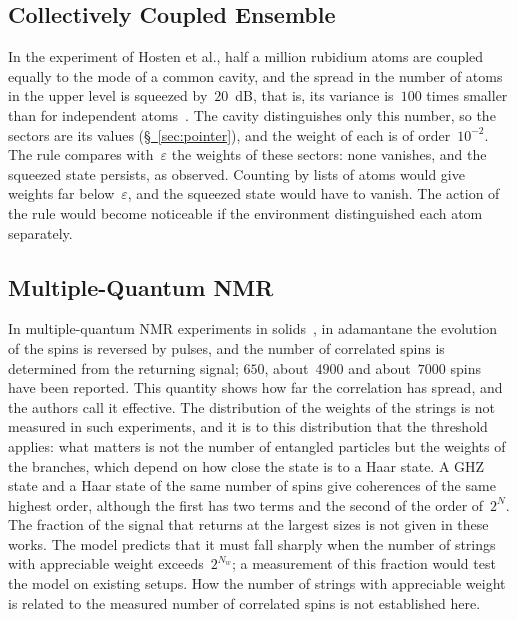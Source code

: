 \documentclass[11pt,a4paper]{article}
\begin{document}
\subsection{Collectively Coupled Ensemble}
\label{sec:squeezed}

In the experiment of Hosten et al., half a million rubidium atoms are coupled equally to the mode of a common cavity, and the spread in the number of atoms in the upper level is squeezed by~$20$~dB, that is, its variance is~$100$ times smaller than for independent atoms~\cite{hosten2016,hosten2016a}. The cavity distinguishes only this number, so the sectors are its values (\hyperref[sec:pointer]{\S~\ref*{sec:pointer}}), and the weight of each is of order~$10^{-2}$. The rule compares with~$\varepsilon$ the weights of these sectors: none vanishes, and the squeezed state persists, as observed. Counting by lists of atoms would give weights far below~$\varepsilon$, and the squeezed state would have to vanish. The action of the rule would become noticeable if the environment distinguished each atom separately.

\subsection{Multiple-Quantum NMR}
\label{sec:nmr}

In multiple-quantum NMR experiments in solids~\cite{krojanski2004,krojanski2006,alvarez2015}, in adamantane the evolution of the spins is reversed by pulses, and the number of correlated spins is determined from the returning signal; $650$, about~$4900$ and about~$7000$ spins have been reported. This quantity shows how far the correlation has spread, and the authors call it effective. The distribution of the weights of the strings is not measured in such experiments, and it is to this distribution that the threshold applies: what matters is not the number of entangled particles but the weights of the branches, which depend on how close the state is to a Haar state. A GHZ state and a Haar state of the same number of spins give coherences of the same highest order, although the first has two terms and the second of the order of~$2^N$. The fraction of the signal that returns at the largest sizes is not given in these works. The model predicts that it must fall sharply when the number of strings with appreciable weight exceeds~$2^{N_w}$; a measurement of this fraction would test the model on existing setups. How the number of strings with appreciable weight is related to the measured number of correlated spins is not established here.
\end{document}
